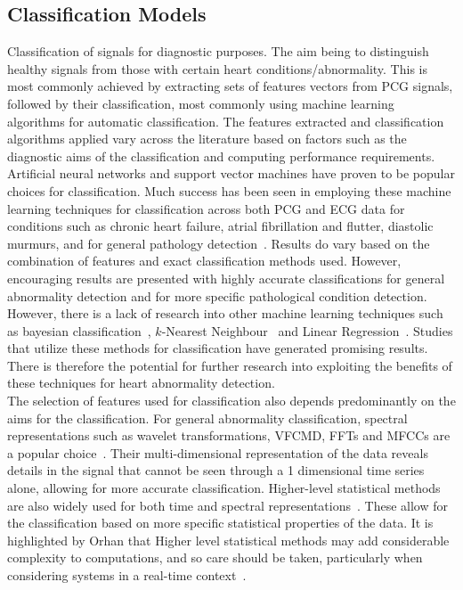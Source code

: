 \documentclass[titlepage, 12pt]{scrartcl} \usepackage{enumitem}
\begin{document}
\subsection{Classification Models}

Classification of signals for diagnostic purposes.  The aim being to
distinguish healthy signals from those with certain heart
conditions/abnormality. This is most commonly achieved by extracting
sets of features vectors from PCG signals, followed by their
classification, most commonly using machine learning algorithms for
automatic classification. The features extracted and classification
algorithms applied vary across the literature based on factors such as
the diagnostic aims of the classification and computing performance
requirements.\\

Artificial neural networks and support vector machines have proven to
be popular choices for classification. Much success has been seen in
employing these machine learning techniques for classification across
both PCG and ECG data for conditions such as chronic heart failure,
atrial fibrillation and flutter, diastolic murmurs, and for general
pathology detection~\parencite{Cathers1995, Wu1995, Bung2000,
Lubaib2016, Maji2014, Ari2010, Maglogiannis2009}. Results do vary based
on the combination of features and exact classification methods used.
However, encouraging results are presented with highly accurate
classifications for general abnormality detection and for more specific
pathological condition detection.\\

However, there is a lack of research into other machine learning
techniques such as bayesian classification~\parencite{Lubaib2016},
$k$-Nearest Neighbour~\parencite{Quiceno-Manrique2010a, Lubaib2016} and
Linear Regression~\parencite{Orhan2013}. Studies that utilize these
methods for classification have generated promising results.  There is
therefore the potential for further research into exploiting the
benefits of these techniques for heart abnormality detection.\\

The selection of features used for classification also depends
predominantly on the aims for the classification. For general
abnormality classification, spectral representations such as wavelet
transformations, VFCMD, FFTs and MFCCs are a popular
choice~\parencite{Bung2000, Wu1995, Yaghouby2009, Dash2009}. Their
multi-dimensional representation of the data reveals details in the
signal that cannot be seen through a 1 dimensional time series alone,
allowing for more accurate classification. Higher-level statistical
methods are also widely used for both time and spectral
representations~\parencite{Bung2000, Quiceno-Manrique2010a,
Schmidt2015, Dash2009, Yaghouby2009}. These allow for the
classification based on more specific statistical properties of the
data. It is highlighted by Orhan that Higher level statistical methods
may add considerable complexity to computations, and so care should be
taken, particularly when considering systems in a real-time
context~\citeyearpar{Orhan2013}.
\end{document}
